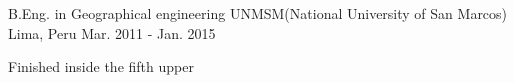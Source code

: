 \begin{cventries}
  \cventry
    {B.Eng. in Geographical engineering}
    {UNMSM(National University of San Marcos)}
    {Lima, Peru}
    {Mar. 2011 - Jan. 2015}
    {
      \begin{cvitems}
        \item {Finished inside the fifth upper}
      \end{cvitems}
    }
\end{cventries}

